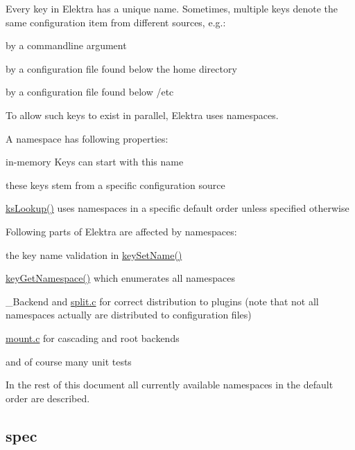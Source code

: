 Every key in Elektra has a unique name. Sometimes, multiple keys denote the same configuration item from different sources, e.\+g.\+:


\begin{DoxyItemize}
\item by a commandline argument
\item by a configuration file found below the home directory
\item by a configuration file found below /etc
\end{DoxyItemize}

To allow such keys to exist in parallel, Elektra uses namespaces.

A namespace has following properties\+:


\begin{DoxyItemize}
\item in-\/memory Keys can start with this name
\item these keys stem from a specific configuration source
\item \hyperlink{group__keyset_gaa34fc43a081e6b01e4120daa6c112004}{ks\+Lookup()} uses namespaces in a specific default order unless specified otherwise
\end{DoxyItemize}

Following parts of Elektra are affected by namespaces\+:


\begin{DoxyItemize}
\item the key name validation in \hyperlink{group__keyname_ga7699091610e7f3f43d2949514a4b35d9}{key\+Set\+Name()}
\item \hyperlink{group__keyname_gafc3ca03ed10f87eb59bdc02cf2a0de8d}{key\+Get\+Namespace()} which enumerates all namespaces
\item \+\_\+\+Backend and \hyperlink{split_8c}{split.\+c} for correct distribution to plugins (note that not all namespaces actually are distributed to configuration files)
\item \hyperlink{mount_8c}{mount.\+c} for cascading and root backends
\item and of course many unit tests
\end{DoxyItemize}

In the rest of this document all currently available namespaces in the default order are described.

\subsection*{spec}

